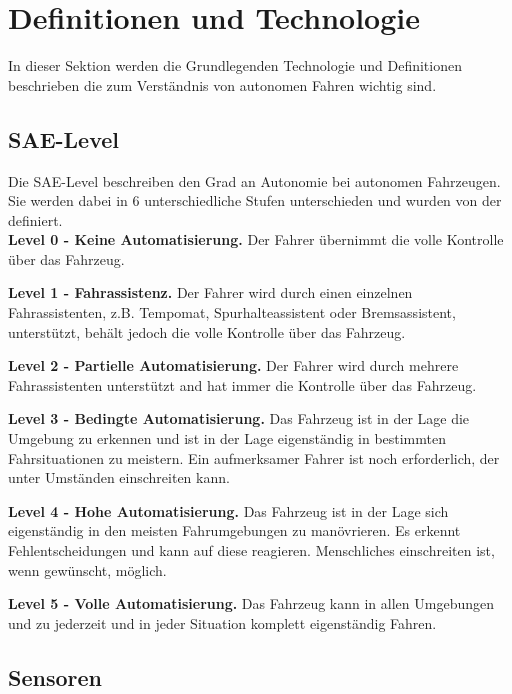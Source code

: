 

\section{Definitionen und Technologie}
\label{sec:definitionen-und-technologie}

In dieser Sektion werden die Grundlegenden Technologie und Definitionen beschrieben die zum Verständnis von autonomen Fahren wichtig sind.

\subsection{SAE-Level}
\label{ssec:sae-level}

Die SAE-Level \cite{standardSAE} beschreiben den Grad an Autonomie bei autonomen Fahrzeugen. Sie werden dabei in 6 unterschiedliche Stufen unterschieden und wurden von der \citeauthor{standardSAE} definiert.\\

\textbf{Level 0 - Keine Automatisierung.} Der Fahrer übernimmt die volle Kontrolle über das Fahrzeug.

\textbf{Level 1 - Fahrassistenz.} Der Fahrer wird durch einen einzelnen Fahrassistenten, z.B. Tempomat, Spurhalteassistent oder Bremsassistent, unterstützt, behält jedoch die volle Kontrolle über das Fahrzeug.

\textbf{Level 2 - Partielle Automatisierung.} Der Fahrer wird durch mehrere Fahrassistenten unterstützt and hat immer die Kontrolle über das Fahrzeug.
    
\textbf{Level 3 - Bedingte Automatisierung.}
Das Fahrzeug ist in der Lage die Umgebung zu erkennen und ist in der Lage eigenständig in bestimmten Fahrsituationen zu meistern. Ein aufmerksamer Fahrer ist noch erforderlich, der unter Umständen einschreiten kann.

\textbf{Level 4 - Hohe Automatisierung.} Das Fahrzeug ist in der Lage sich eigenständig in den meisten Fahrumgebungen zu manövrieren. Es erkennt Fehlentscheidungen und kann auf diese reagieren. Menschliches einschreiten ist, wenn gewünscht, möglich.

\textbf{Level 5 - Volle Automatisierung.} Das Fahrzeug kann in allen Umgebungen und zu jederzeit und in jeder Situation komplett eigenständig Fahren.

\subsection{Sensoren}


